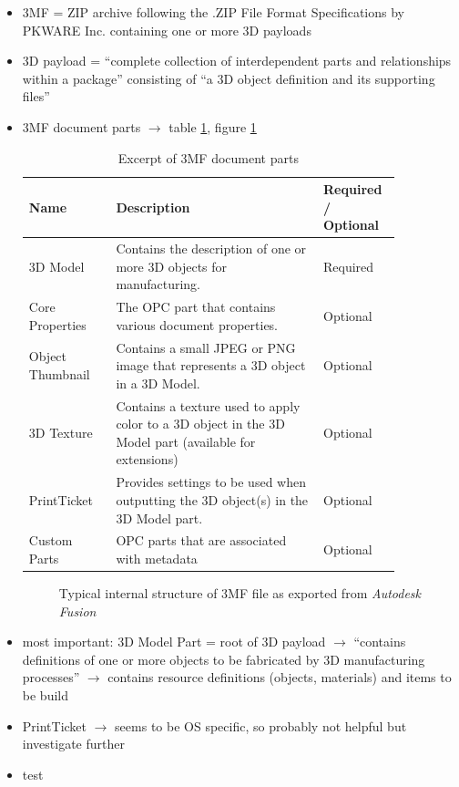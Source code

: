 \begin{itemize}
    \item 3MF = ZIP archive following the .ZIP File Format Specifications by PKWARE Inc. containing one or more 3D payloads
    \item 3D payload = ``complete collection of interdependent parts and relationships within a package'' consisting of ``a 3D object definition and its supporting files''
    \item 3MF document parts $\rightarrow$ table \ref{doc_parts}, figure \ref{doc_structure}

    \begin{table}
        \renewcommand{\arraystretch}{1.3}
        \begin{tabular}{m{0.21\linewidth} m{0.5\linewidth} m{0.14\linewidth}}
            \textbf{Name} & \textbf{Description} & \textbf{Required /} \textbf{Optional} \\
            \hline
            3D Model & Contains the description of one or more 3D objects for
manufacturing. & Required \\
            Core Properties & The OPC part that contains various document properties. & Optional \\
            Object Thumbnail & Contains a small JPEG or PNG image that represents a 3D object in a 3D Model. & Optional \\
            3D Texture & Contains a texture used to apply color to a 3D object in the 3D Model part (available for extensions) & Optional \\
            PrintTicket & Provides settings to be used when outputting the 3D object(s) in the 3D Model part. & Optional \\
            Custom Parts & OPC parts that are associated with metadata & Optional
        \end{tabular}\smallskip

        \caption{Excerpt of 3MF document parts\cite[p.~4]{3mf_consortium_3mf_2025}}
        \label{doc_parts}
    \end{table}
    
    \begin{figure}[h]
        \caption{Typical internal structure of 3MF file as exported from \emph{Autodesk Fusion}}
        \label{doc_structure}
    \end{figure}
    \item most important: 3D Model Part = root of 3D payload $\rightarrow$ ``contains definitions of one or more objects to be fabricated by 3D manufacturing processes''\cite[p.~6]{3mf_consortium_3mf_2025} $\rightarrow$ contains resource definitions (objects, materials) and items to be build 
    \item PrintTicket $\rightarrow$ seems to be OS specific, so probably not helpful but \todo investigate further
    \item test
\end{itemize}

